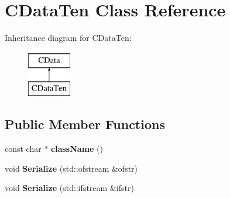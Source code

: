 \hypertarget{classCDataTen}{\section{C\-Data\-Ten Class Reference}
\label{classCDataTen}
}
Inheritance diagram for C\-Data\-Ten\-:\begin{figure}[H]
\begin{center}
\leavevmode
\includegraphics[height=2.000000cm]{classCDataTen}
\end{center}
\end{figure}
\subsection*{Public Member Functions}
\begin{DoxyCompactItemize}
\item 
\hypertarget{classCDataTen_a85cb23b4ec1c41f5a9d9b0e9029ba5ad}{const char $\ast$ {\bfseries class\-Name} ()}\label{classCDataTen_a85cb23b4ec1c41f5a9d9b0e9029ba5ad}

\item 
\hypertarget{classCDataTen_add63d57fe0a73ba10e027d4e579f8dd7}{void {\bfseries Serialize} (std\-::ofstream \&ofstr)}\label{classCDataTen_add63d57fe0a73ba10e027d4e579f8dd7}

\item 
\hypertarget{classCDataTen_a02b9236a94f1defa606387fdedf57446}{void {\bfseries Serialize} (std\-::ifstream \&ifstr)}\label{classCDataTen_a02b9236a94f1defa606387fdedf57446}

\end{DoxyCompactItemize}
